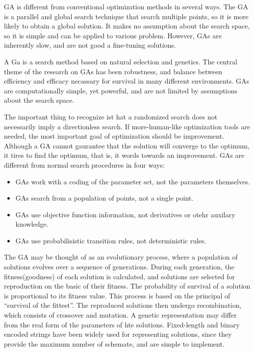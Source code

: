 \documentclass[pdftex,11pt]{article}
\begin{document}
GA is different from conventional optimization methods in several ways. The GA is a parallel and global search technique that search multiple points, so it is more likely to obtain a global solution. It makes no assumption about the search space, so it is simple and can be applied to various problem. However, GAs are inherently slow, and are not good a fine-tuning solutions.

A Ga is a search method based on natural selection and genetics. The central theme of the research on GAs has been robustness, and balance between efficiency and efficacy necassary for survival in many different environments. GAs are computationally simple, yet powerful, and are not limited by assumptions about the search space.

The important thing to recognize ist hat a randomized search does not necessarily imply a directionless search. If more-human-like optimization tools are needed, the most important goal of optimization should be improvement. Although a GA cannot gaurantee that the solution will converge to the optimum, it tires to find the optimum, that is, it words towards an improvement. GAs are different from normal search procedures in four ways:
\begin{itemize}
\item GAs work with a coding of the parameter set, not the parameters themselves.
\item GAs search from a population of points, not a single point.
\item GAs use objective function information, not derivatives or otehr auxilary knowledge.
\item GAs use probabilisistic transition rules, not deterministic rules.
\end{itemize}

The GA may be thought of as an evolutionary process, where a population of solutions evolves over a sequence of generations. During each generation, the fitness(goodness) of each solution is calculated, and solutions are selected for reproduction on the basic of their fitness. The probability of survival of a solution is proportional to its fitness value. This process is based on the principal of ``survival of the fittest''. The reproduced solutions then undergo recombination, which consists of crossover and mutation. A genetic representation may differ from the real form of the parameters of hte solutions. Fixed-length and binary encoded strings have been widely used for representing solutions, since they provide the maximum number of schemate, and are simple to implement.
\end{document}
